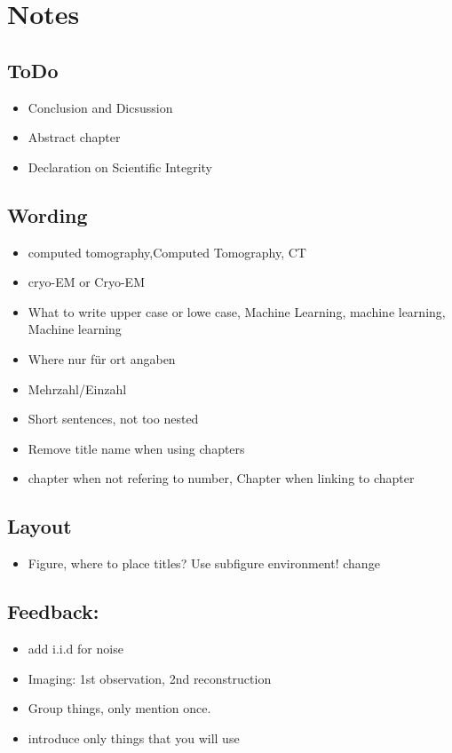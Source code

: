 \chapter{Notes}

\section{ToDo}
\begin{itemize}
    \item Conclusion and Dicsussion
    \item Abstract chapter
    \item Declaration on Scientific Integrity
\end{itemize}


\section{Wording}
\begin{itemize}
    \item computed tomography,Computed Tomography, CT
    \item cryo-EM or Cryo-EM
    \item What to write upper case or lowe case, Machine Learning, machine learning, Machine learning
    \item Where nur für ort angaben
    \item Mehrzahl/Einzahl
    \item Short sentences, not too nested
    \item Remove title name when using chapters
    \item chapter when not refering to number, Chapter when linking to chapter
\end{itemize}

\section*{Layout}
\begin{itemize}
    \item Figure, where to place titles? Use subfigure environment! change 
\end{itemize}

\section{Feedback:}
\begin{itemize}
    \item add i.i.d for noise
    \item Imaging: 1st observation, 2nd reconstruction
    \item Group things, only mention once.
    \item introduce only things that you will use
\end{itemize}


\clearpage
